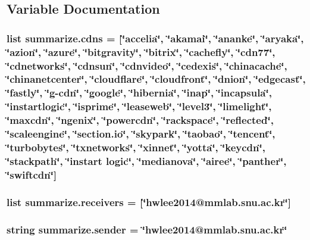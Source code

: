 \subsection{Variable Documentation}
\hypertarget{namespacesummarize_a6a33e0d2e15dece13ba677f313d425ed}{
\subsubsection[{cdns}]{\setlength{\rightskip}{0pt plus 5cm}list summarize.\-cdns = \mbox{[}\char`\"{}accelia\char`\"{}, \char`\"{}akamai\char`\"{}, \char`\"{}ananke\char`\"{}, \char`\"{}aryaka\char`\"{}, \char`\"{}azion\char`\"{}, \char`\"{}azure\char`\"{}, \char`\"{}bitgravity\char`\"{}, \char`\"{}bitrix\char`\"{}, \char`\"{}cachefly\char`\"{}, \char`\"{}cdn77\char`\"{}, \char`\"{}cdnetworks\char`\"{}, \char`\"{}cdnsun\char`\"{}, \char`\"{}cdnvideo\char`\"{}, \char`\"{}cedexis\char`\"{}, \char`\"{}chinacache\char`\"{}, \char`\"{}chinanetcenter\char`\"{}, \char`\"{}cloudflare\char`\"{}, \char`\"{}cloudfront\char`\"{}, \char`\"{}dnion\char`\"{}, \char`\"{}edgecast\char`\"{}, \char`\"{}fastly\char`\"{}, \char`\"{}g-\/cdn\char`\"{}, \char`\"{}google\char`\"{}, \char`\"{}hibernia\char`\"{}, \char`\"{}inap\char`\"{}, \char`\"{}incapsula\char`\"{}, \char`\"{}instartlogic\char`\"{}, \char`\"{}isprime\char`\"{}, \char`\"{}leaseweb\char`\"{}, \char`\"{}level3\char`\"{}, \char`\"{}limelight\char`\"{}, \char`\"{}maxcdn\char`\"{}, \char`\"{}ngenix\char`\"{}, \char`\"{}powercdn\char`\"{}, \char`\"{}rackspace\char`\"{}, \char`\"{}reflected\char`\"{}, \char`\"{}scaleengine\char`\"{}, \char`\"{}section.\-io\char`\"{}, \char`\"{}skypark\char`\"{}, \char`\"{}taobao\char`\"{}, \char`\"{}tencent\char`\"{}, \char`\"{}turbobytes\char`\"{}, \char`\"{}txnetworks\char`\"{}, \char`\"{}xinnet\char`\"{}, \char`\"{}yotta\char`\"{}, \char`\"{}keycdn\char`\"{}, \char`\"{}stackpath\char`\"{}, \char`\"{}instart logic\char`\"{}, \char`\"{}medianova\char`\"{}, \char`\"{}airee\char`\"{}, \char`\"{}panther\char`\"{}, \char`\"{}swiftcdn\char`\"{}\mbox{]}}}\label{namespacesummarize_a6a33e0d2e15dece13ba677f313d425ed}
\hypertarget{namespacesummarize_a0307113d73aaad175b394fce0138f5a3}{
\subsubsection[{receivers}]{\setlength{\rightskip}{0pt plus 5cm}list summarize.\-receivers = \mbox{[}\char`\"{}hwlee2014@mmlab.\-snu.\-ac.\-kr\char`\"{}\mbox{]}}}\label{namespacesummarize_a0307113d73aaad175b394fce0138f5a3}
\hypertarget{namespacesummarize_a4be54e246d619c974b7cd5043c89533b}{
\subsubsection[{sender}]{\setlength{\rightskip}{0pt plus 5cm}string summarize.\-sender = \char`\"{}hwlee2014@mmlab.\-snu.\-ac.\-kr\char`\"{}}}\label{namespacesummarize_a4be54e246d619c974b7cd5043c89533b}
